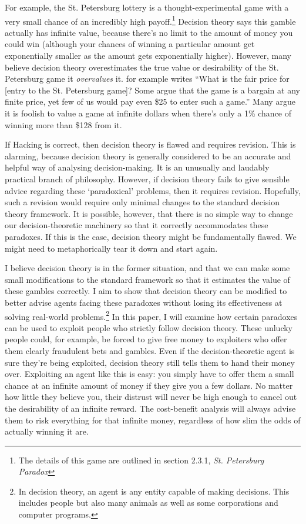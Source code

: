 \documentclass{article}
\begin{document}
For example, the St. Petersburg lottery is a thought-experimental game with a very small chance of an incredibly high payoff.\footnote{The details of this game are outlined in section 2.3.1, \textit{St. Petersburg Paradox}} Decision theory says this gamble actually has infinite value, because there's no limit to the amount of money you could win (although your chances of winning a particular amount get exponentially smaller as the amount gets exponentially higher). However, many believe decision theory overestimates the true value or desirability of the St. Petersburg game \textemdash{} it \textit{overvalues} it. \citet{hacking1980strange} for example writes ``What is the fair price for [entry to the St. Petersburg game]? Some argue that the game is a bargain at any finite price, yet few of us would pay even \$25 to enter such a game.'' Many argue it is foolish to value a game at infinite dollars when there's only a 1\% chance of winning more than \$128 from it.

If Hacking is correct, then decision theory is flawed and requires revision. This is alarming, because decision theory is generally considered to be an accurate and helpful way of analysing decision-making. It is an unusually and laudably practical branch of philosophy. However, if decision theory fails to give sensible advice regarding these `paradoxical' problems, then it requires revision. Hopefully, such a revision would require only minimal changes to the standard decision theory framework. It is possible, however, that there is no simple way to change our decision-theoretic machinery so that it correctly accommodates these paradoxes. If this is the case, decision theory might be fundamentally flawed. We might need to metaphorically tear it down and start again. 

I believe decision theory is in the former situation, and that we can make some small modifications to the standard framework so that it estimates the value of these gambles correctly. I aim to show that decision theory can be modified to better advise agents facing these paradoxes without losing its effectiveness at solving real-world problems.\footnote{In decision theory, an agent is any entity capable of making decisions. This includes people but also many animals as well as some corporations and computer programs.} In this paper, I will examine how certain paradoxes can be used to exploit people who strictly follow decision theory. These unlucky people could, for example, be forced to give free money to exploiters who offer them clearly fraudulent bets and gambles. Even if the decision-theoretic agent is sure they're being exploited, decision theory still tells them to hand their money over. Exploiting an agent like this is easy: you simply have to offer them a small chance at an infinite amount of money if they give you a few dollars. No matter how little they believe you, their distrust will never be high enough to cancel out the desirability of an infinite reward. The cost-benefit analysis will always advise them to risk everything for that infinite money, regardless of how slim the odds of actually winning it are.
\end{document}
